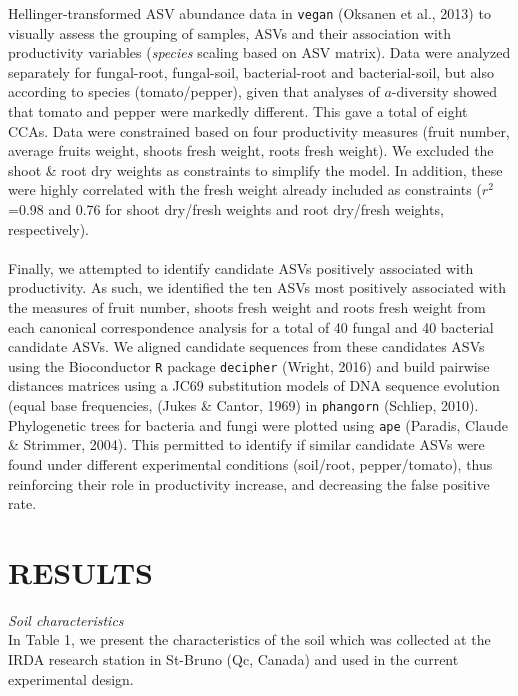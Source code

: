 \documentclass[11pt,]{article}
\begin{document}
Hellinger-transformed ASV abundance data in \texttt{vegan} (Oksanen et
al., 2013) to visually assess the grouping of samples, ASVs and their
association with productivity variables (\emph{species} scaling based on
ASV matrix). Data were analyzed separately for fungal-root, fungal-soil,
bacterial-root and bacterial-soil, but also according to species
(tomato/pepper), given that analyses of \(a\)-diversity showed that
tomato and pepper were markedly different. This gave a total of eight
CCAs. Data were constrained based on four productivity measures (fruit
number, average fruits weight, shoots fresh weight, roots fresh weight).
We excluded the shoot \& root dry weights as constraints to simplify the
model. In addition, these were highly correlated with the fresh weight
already included as constraints (\(r^2\)=0.98 and 0.76 for shoot
dry/fresh weights and root dry/fresh weights, respectively).\\
\hspace*{0.333em}\\
Finally, we attempted to identify candidate ASVs positively associated
with productivity. As such, we identified the ten ASVs most positively
associated with the measures of fruit number, shoots fresh weight and
roots fresh weight from each canonical correspondence analysis for a
total of 40 fungal and 40 bacterial candidate ASVs. We aligned candidate
sequences from these candidates ASVs using the Bioconductor \texttt{R}
package \texttt{decipher} (Wright, 2016) and build pairwise distances
matrices using a JC69 substitution models of DNA sequence evolution
(equal base frequencies, (Jukes \& Cantor, 1969) in \texttt{phangorn}
(Schliep, 2010). Phylogenetic trees for bacteria and fungi were plotted
using \texttt{ape} (Paradis, Claude \& Strimmer, 2004). This permitted
to identify if similar candidate ASVs were found under different
experimental conditions (soil/root, pepper/tomato), thus reinforcing
their role in productivity increase, and decreasing the false positive
rate.\\
\hspace*{0.333em}

\newpage  

\section{RESULTS}\label{results}

\emph{Soil characteristics}\\
In Table 1, we present the characteristics of the soil which was
collected at the IRDA research station in St-Bruno (Qc, Canada) and used
in the current experimental design.\\
\hspace*{0.333em}
\end{document}
